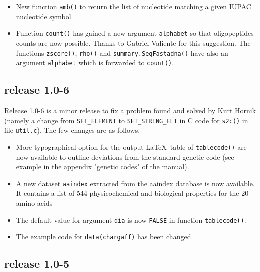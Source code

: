 \documentclass{article}
\begin{document}
\begin{itemize}
\item New function \texttt{amb()} to return the list of nucleotide matching 
a given IUPAC nucleotide symbol.

\item Function \texttt{count()} has gained a new argument \texttt{alphabet}
so that oligopeptides counts are now possible. Thanks to Gabriel Valiente
for this suggestion. The functions \texttt{zscore()}, \texttt{rho()} and
\texttt{summary.SeqFastadna()} have also an argument \texttt{alphabet} which
is forwarded to \texttt{count()}.

\end{itemize}

\subsection{release 1.0-6}

Release 1.0-6 is a minor release to fix a problem found and solved by Kurt Hornik
(namely a change from \texttt{SET\_ELEMENT} to \texttt{SET\_STRING\_ELT}
in C code for \texttt{s2c()} in file \texttt{util.c}). The few changes are
as follows.

\begin{itemize}

\item More typographical option for the output \LaTeX~table of \texttt{tablecode()}
are now available to outline deviations from the standard genetic code (see example in the
appendix "genetic codes" of the manual).

\item A new dataset \texttt{aaindex} extracted from the aaindex database
\cite{aaindex1, aaindex2, aaindex3} is now available. It contains a list
of 544 physicochemical and biological properties for the 20 amino-acids

\item The default value for argument \texttt{dia} is now \texttt{FALSE}
in function \texttt{tablecode()}.

\item The example code for \texttt{data(chargaff)} has been changed.

\end{itemize}

\subsection{release 1.0-5}
\end{document}
